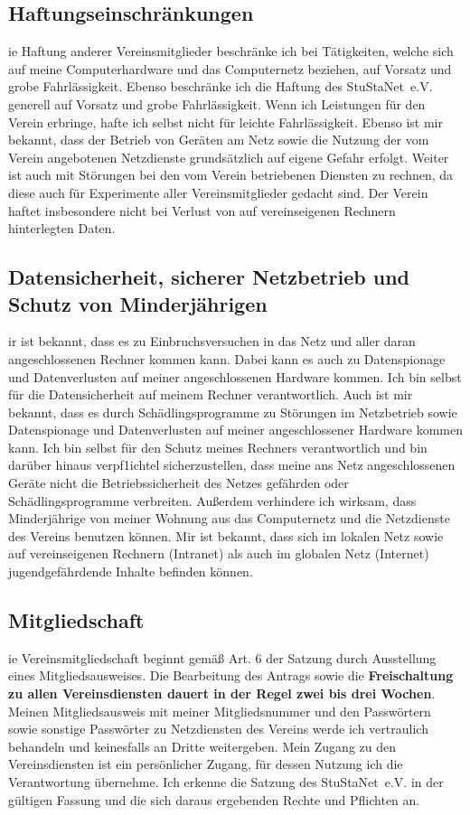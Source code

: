 \documentclass[a4paper,10pt]{scrartcl}
\begin{document}
\subsection*{Haftungseinschränkungen}
ie Haftung anderer Vereinsmitglieder beschränke ich bei Tätigkeiten, welche sich auf meine Computerhardware und das Computernetz beziehen, auf Vorsatz und grobe Fahrlässigkeit. Ebenso beschränke ich die Haftung des StuStaNet~e.V. generell auf Vorsatz und grobe Fahrlässigkeit. Wenn ich Leistungen für den Verein erbringe, hafte ich selbst nicht für leichte Fahrlässigkeit. Ebenso ist mir bekannt, dass der Betrieb von Geräten am Netz sowie die Nutzung der vom Verein angebotenen Netzdienste grundsätzlich auf eigene Gefahr erfolgt. Weiter ist auch mit Störungen bei den vom Verein betriebenen Diensten zu rechnen, da diese auch für Experimente aller Vereinsmitglieder gedacht sind. Der Verein haftet insbesondere nicht bei Verlust von auf vereinseigenen Rechnern hinterlegten Daten.

\subsection*{Datensicherheit, sicherer Netzbetrieb und Schutz von Minderjährigen}
ir ist bekannt, dass es zu Einbruchsversuchen in das Netz und aller daran angeschlossenen Rechner kommen kann. Dabei kann es auch zu Datenspionage und Datenverlusten auf meiner angeschlossenen Hardware kommen. Ich bin selbst für die Datensicherheit auf meinem Rechner verantwortlich. Auch ist mir bekannt, dass es durch Schädlingsprogramme zu Störungen im Netzbetrieb sowie Datenspionage und Datenverlusten auf meiner angeschlossener Hardware kommen kann. Ich bin selbst für den Schutz meines Rechners verantwortlich und bin darüber hinaus verpf1ichtel sicherzustellen, dass meine ans Netz angeschlossenen Geräte nicht die Betriebssicherheit des Netzes gefährden oder Schädlingsprogramme verbreiten. Außerdem verhindere ich wirksam, dass Minderjährige von meiner Wohnung aus das Computernetz und die Netzdienste des Vereins benutzen können. Mir ist bekannt, dass sich im lokalen Netz sowie auf vereinseigenen Rechnern (Intranet) als auch im globalen Netz (Internet) jugendgefährdende Inhalte befinden können.

\subsection*{Mitgliedschaft}
ie Vereinsmitgliedschaft beginnt gemäß Art. 6 der Satzung durch Ausstellung eines Mitgliedsausweises. Die Bearbeitung des Antrags sowie die \textbf{Freischaltung zu allen Vereinsdiensten dauert in der Regel zwei bis drei Wochen}. Meinen Mitgliedsausweis mit meiner Mitgliedsnummer und den Passwörtern sowie sonstige Passwörter zu Netzdiensten des Vereins werde ich vertraulich behandeln und keinesfalls an Dritte weitergeben. Mein Zugang zu den Vereinsdiensten ist ein persönlicher Zugang, für dessen Nutzung ich die Verantwortung übernehme. Ich erkenne die Satzung des StuStaNet~e.V. in der gültigen Fassung und die sich daraus ergebenden Rechte und Pflichten an.
\end{document}
